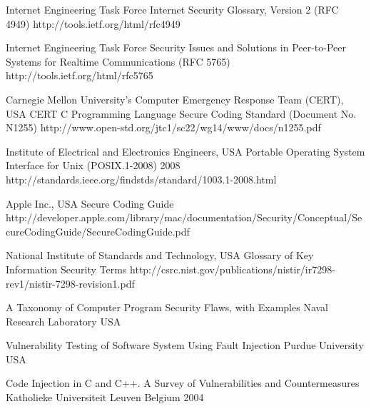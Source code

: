 \begin{thebibliography}{9}
		{Internet Engineering Task Force}
		{Internet Security Glossary, Version 2 ({RFC} 4949)}
		{}
		{http://tools.ietf.org/html/rfc4949}
		
		{Internet Engineering Task Force}
		{Security Issues and Solutions in Peer-to-Peer Systems for Realtime Communications ({RFC} 5765)}
		{}
		{http://tools.ietf.org/html/rfc5765}
	
		{Carnegie Mellon University's Computer Emergency Response Team (CERT), USA}
		{{CERT} {C} Programming Language Secure Coding Standard (Document No. N1255)}
		{}
		{http://www.open-std.org/jtc1/sc22/wg14/www/docs/n1255.pdf}
		
		{Institute of Electrical and Electronics Engineers, USA}
		{Portable Operating System Interface for {U}nix ({POSIX}.1-2008)}
		{2008}
		{http://standards.ieee.org/findstds/standard/1003.1-2008.html}
		
		{Apple Inc., USA}
		{Secure Coding Guide}
		{}
		{http://developer.apple.com/library/mac/documentation/Security/Conceptual/SecureCodingGuide/SecureCodingGuide.pdf}

		{National Institute of Standards and Technology, USA}
		{Glossary of Key Information Security Terms}
		{}
		{http://csrc.nist.gov/publications/nistir/ir7298-rev1/nistir-7298-revision1.pdf}
		

		{
			\biband
			\biband
			\biband
			}
		{A Taxonomy of Computer Program Security Flaws, with Examples}
		{Naval Research Laboratory}
		{USA}
		{}
		
		{
			\biband
			}
		{Vulnerability Testing of Software System Using Fault Injection}
		{Purdue University}
		{USA}
		{}

		{
			\biband
			\biband
			}
		{Code Injection in {C} and {C++}. A Survey of Vulnerabilities and Countermeasures}
		{Katholieke Universiteit Leuven}
		{Belgium}
		{2004}
		

\end{thebibliography}
